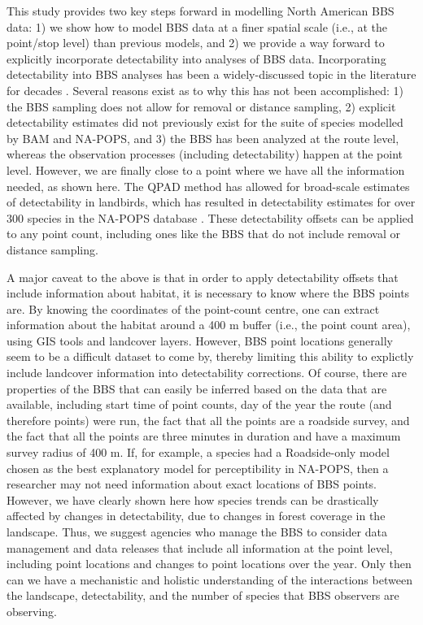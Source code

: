 \documentclass[12pt]{article}
\begin{document}
\par This study provides two key steps forward in modelling North American BBS data: 1) we show how to model BBS data at a finer spatial scale (i.e., at the point/stop level) than previous models, and 2) we provide a way forward to explicitly incorporate detectability into analyses of BBS data.
Incorporating detectability into BBS analyses has been a widely-discussed topic in the literature for decades \citep{sauer_observer_1994, ankorikarlinsky_north_2022, zhang_habitat_2021, somershoe_combining_2006, griffith_traffic_2010, binley_better_2023, knight_combination_2021}.
Several reasons exist as to why this has not been accomplished: 1) the BBS sampling does not allow for removal or distance sampling, 2) explicit detectability estimates did not previously exist for the suite of species modelled by BAM and NA-POPS, and 3) the BBS has been analyzed at the route level, whereas the observation processes (including detectability) happen at the point level.
However, we are finally close to a point where we have all the information needed, as shown here.
The QPAD method \citep{solymos_calibrating_2013} has allowed for broad-scale estimates of detectability in landbirds, which has resulted in detectability estimates for over 300 species in the NA-POPS database \citep{edwards_point_2023}.
These detectability offsets can be applied to any point count, including ones like the BBS that do not include removal or distance sampling.

\par A major caveat to the above is that in order to apply detectability offsets that include information about habitat, it is necessary to know where the BBS points are.
By knowing the coordinates of the point-count centre, one can extract information about the habitat around a 400 m buffer (i.e., the point count area), using GIS tools and landcover layers. 
However, BBS point locations generally seem to be a difficult dataset to come by, thereby limiting this ability to explictly include landcover information into detectability corrections.
Of course, there are properties of the BBS that can easily be inferred based on the data that are available, including start time of point counts, day of the year the route (and therefore points) were run, the fact that all the points are a roadside survey, and the fact that all the points are three minutes in duration and have a maximum survey radius of 400 m.
If, for example, a species had a Roadside-only model chosen as the best explanatory model for perceptibility in NA-POPS, then a researcher may not need information about exact locations of BBS points.
However, we have clearly shown here how species trends can be drastically affected by changes in detectability, due to changes in forest coverage in the landscape.
Thus, we suggest agencies who manage the BBS to consider data management and data releases that include all information at the point level, including point locations and changes to point locations over the year.
Only then can we have a mechanistic and holistic understanding of the interactions between the landscape, detectability, and the number of species that BBS observers are observing.



	
\end{document}
